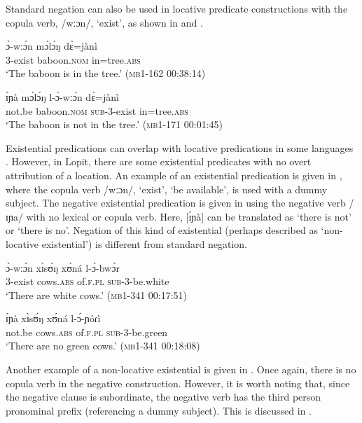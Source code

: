 \documentclass[output=paper,colorlinks,citecolor=brown,draftmode]{langscibook}
\begin{document}
Standard negation can also be used in locative predicate constructions with the copula verb, /wːɔn/, ‘exist’, as shown in  and .

\ea\label{ex:lop:37}
        \gll ɔ̀-wːɔ́n mɔ́lɔ́ŋ dɛ̀=jànì   \\ 
             3-exist baboon\textsc{.nom} in=tree.\textsc{abs} \\
        \glt ‘The baboon is in the tree.’   (\textsc{mb1-162} \textsc{00:38}:14)
\z

\ea\label{ex:lop:38}
        \gll ɪ́ɲà mɔ́lɔ́ŋ l-ɔ̀-wːɔ́n dɛ̀=jànì  \\ 
             not.be baboon\textsc{.nom} \textsc{sub}{}-3-exist in=tree.\textsc{abs} \\
        \glt ‘The baboon is not in the tree.’   (\textsc{mb1-171} \textsc{00}:01:45)
\z

Existential predications can overlap with locative predications in some languages \citep[240]{Dryer2007}. However, in Lopit, there are some existential predicates with no overt attribution of a location.  An example of an existential predication is given in , where the copula verb /wːɔn/, ‘exist’, ‘be available’, is used with a dummy subject. The negative existential predication is given in  using the negative verb /ɪɲa/ with no lexical or copula verb. Here, [ɪ́ɲà] can be translated as ‘there is not' or ‘there is no'. Negation of this kind of existential (perhaps described as ‘non-locative existential’) is different from standard negation. 

\ea\label{ex:lop:39}
        \gll ɔ̀-wːɔ́n xɪ̀sʊ́ŋ xʊ́ná l-ɔ́-bwɔ̀r  \\ 
             3-exist cows.\textsc{abs} of.\textsc{f.pl} \textsc{sub-3-}be.white \\
        \glt ‘There are white cows.’ (\textsc{mb1-341} 00:17:51)
\z

\ea\label{ex:lop:40}
        \gll ɪ́ɲà xɪ̀sʊ́ŋ xʊ́ná l-ɔ́-ɲóɾì  \\ 
             not.be cows.\textsc{abs} of.\textsc{f.pl} \textsc{sub-3-}be.green \\
        \glt ‘There are no green cows.’ (\textsc{mb1-341} 00:18:08)
\z

Another example of a non-locative existential is given in .  Once again, there is no copula verb in the negative construction. However, it is worth noting that, since the negative clause is subordinate, the negative verb has the third person pronominal prefix (referencing a dummy subject). This is discussed in .
\end{document}
